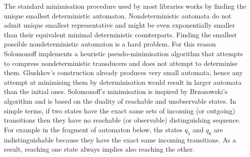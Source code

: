 \documentclass[12pt]{article}
\begin{document}
The standard minimisation procedure used by most libraries works by finding the unique smallest deterministic automaton. Nondeterministic automata do not admit unique smallest representative and might be even exponentially smaller than their equivalent minimal deterministic counterparts. Finding the smallest possible nondeterministic automaton is a hard problem. For this reason Solomonoff implements a heuristic pseudo-minimisation algorithm that attempts to compress nondeterministic transducers and does not attempt to determinise them. Glushkov's construction already produces very small automata, hence any attempt at minimising them by determinisation would result in larger automata than the initial ones. Solomonoff's minimisation is inspired by Brzozowski's algorithm and is based on the duality of reachable and unobservable states. In simple terms, if two states have the exact same  sets of incoming (or outgoing) transitions then they have no reachable (or observable) distinguishing sequence. For example in the fragment of automaton below, the states $q_5$ and $q_6$ are indistinguishable because they have the exact same incoming transitions. As a result, reaching one state always implies also reaching the other.
\end{document}
